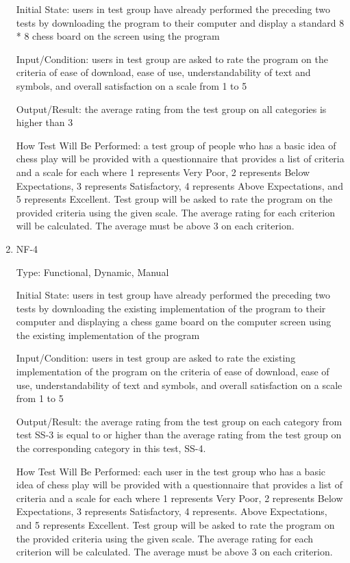 \documentclass[12pt, titlepage]{article}
\begin{document}
\begin{enumerate}
Initial State: users in test group have already performed the preceding two tests by downloading the program to their computer and display a standard 8 * 8 chess board on the screen using the program

Input/Condition: users in test group are asked to rate the program on the criteria of ease of download, ease of use, understandability of text and symbols, and overall satisfaction on a scale from 1 to 5

Output/Result: the average rating from the test group on all categories is higher than 3

How Test Will Be Performed: a test group of people who has a basic idea of chess play will be provided with a questionnaire that provides a list of criteria and a scale for each where 1 represents Very Poor, 2 represents Below Expectations, 3 represents Satisfactory, 4 represents Above Expectations, and 5 represents Excellent. Test group will be asked to rate the program on the provided criteria using the given scale. The average rating for each criterion will be calculated. The average must be above 3 on each criterion.


\item{NF-4\\}

Type: Functional, Dynamic, Manual

Initial State: users in test group have already performed the preceding two tests by downloading the existing implementation of the program to their computer and displaying a chess game board on the computer screen using the existing implementation of the program

Input/Condition: users in test group are asked to rate the existing implementation of the program on the criteria of ease of download, ease of use, understandability of text and symbols, and overall satisfaction on a scale from 1 to 5

Output/Result: the average rating from the test group on each category from test SS-3 is equal to or higher than the average rating from the test group on the corresponding category in this test, SS-4.

How Test Will Be Performed: each user in the test group who has a basic idea of chess play will be provided with a questionnaire that provides a list of criteria and a scale for each where 1 represents Very Poor, 2 represents Below Expectations, 3 represents Satisfactory, 4 represents. Above Expectations, and 5 represents Excellent. Test group will be asked to rate the program on the provided criteria using the given scale. The average rating for each criterion will be calculated. The average must be above 3 on each criterion.


\end{enumerate}
\end{document}
